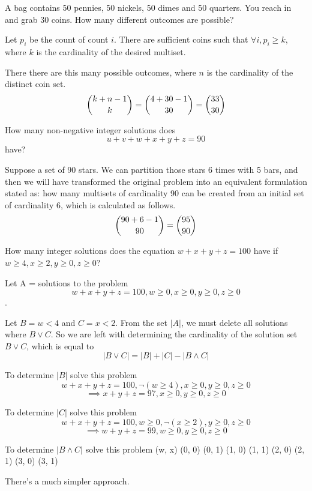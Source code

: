 \documentclass[openany, 11pt]{book}
\begin{document}
\begin{exercise}{}{}
	A bag contains 50 pennies, 50 nickels, 50 dimes and 50 quarters. You reach
	in and grab 30 coins. How many different outcomes are possible?
	\begin{alist}
		\item Let $p_i$ be the count of count $i$. There are sufficient coins such that
		$\forall i, p_i\geq k$, where $k$ is the cardinality of the desired
		multiset.
		\item There there are this many possible outcomes, where $n$ is the cardinality
		of the distinct coin set.
		$$ \dbinom{k+n-1}{k} = \dbinom{4+30-1}{30}=\dbinom{33}{30}$$
	\end{alist}
\end{exercise}

\begin{exercise}{}{}
	How many non-negative integer solutions does $$u + v+ w+ x+
		y+ z = 90$$ have?
	\begin{alist}
		\item Suppose a set of 90 stars.  We can partition those stars 6 times with 5
		bars, and then we will have transformed the original problem into an
		equivalent formulation stated as: how many multisets of cardinality 90 can
		be created from an initial set of cardinality 6, which is calculated as
		follows.
		$$ \dbinom{90+6-1}{90} = \dbinom{95}{90}$$
	\end{alist}
\end{exercise}

\begin{exercise}{}{}
	How many integer solutions does the equation
	$w + x + y+ z = 100$ have if $w \geq 4, x \geq 2, y \geq 0, z \geq 0$?
	\begin{alist}
		\item Let A = solutions to the problem
		$$w + x + y+ z = 100, w \geq 0, x \geq 0, y \geq 0, z \geq 0$$.
		\item Let $B=w<4$ and $C=x<2$. From the set $|A|$, we must delete all solutions
		where $B\lor C$. So we are left with determining the cardinality of the
		solution set $B \lor C$, which is equal to
		$$
			|B\lor C| = |B| + |C| - |B\land C|
		$$
		\item To determine $|B|$ solve this problem
		$$w + x + y+ z = 100, \neg(w \geq 4), x \geq 0, y \geq 0, z \geq 0$$
		$$\implies x + y+ z = 97, x \geq 0, y \geq 0, z \geq 0$$

		\item To determine $|C|$ solve this problem
		$$w + x + y+ z = 100, w \geq 0, \neg(x \geq 2), y \geq 0, z \geq 0$$
		$$\implies w + y+ z = 99, w \geq 0, y \geq 0, z \geq 0$$

		\item To determine $|B\land C|$ solve this problem
		(w, x)
		(0, 0)
		(0, 1)
		(1, 0)
		(1, 1)
		(2, 0)
		(2, 1)
		(3, 0)
		(3, 1)
		\item There's a much simpler approach.
	\end{alist}
\end{exercise}
\end{document}
